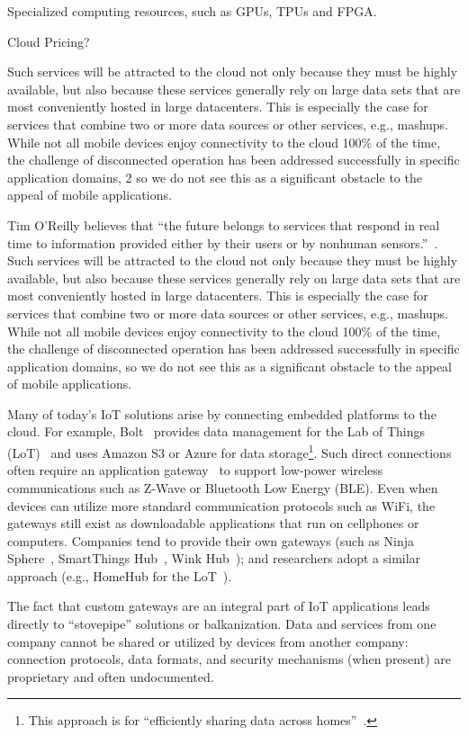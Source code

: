 Specialized computing resources, such as GPUs, TPUs and FPGA.

Cloud Pricing?

Such services will be attracted to the cloud not only because they must be
highly available, but also because these services generally rely on large data
sets that are most conveniently hosted in large datacenters. This is especially
the case for services that combine two or more data sources or other services,
e.g., mashups. While not all mobile devices enjoy connectivity to the cloud
100\% of the time, the challenge of disconnected operation has been addressed
successfully in specific application domains, 2 so we do not see this as a
significant obstacle to the appeal of mobile applications.

Tim O’Reilly believes that ``the future belongs to services that respond in real
time to information provided either by their users or by nonhuman
sensors.''~\cite{siegele2008let}. Such services will be attracted to the cloud
not only because they must be highly available, but also because these services
generally rely on large data sets that are most conveniently hosted in large
datacenters. This is especially the case for services that combine two or more
data sources or other services, e.g., mashups. While not all mobile devices
enjoy connectivity to the cloud 100\% of the time, the challenge of disconnected
operation has been addressed successfully in specific application domains, so we
do not see this as a significant obstacle to the appeal of mobile applications.

Many of today's IoT solutions arise by connecting embedded platforms to the
cloud.  For example, Bolt~\cite{gupta2014bolt} provides data management for the
Lab of Things (LoT)~\cite{brush2013lab} and uses Amazon S3 or Azure for data
storage\footnote{This approach is for ``efficiently sharing data across
  homes''~\cite{gupta2014bolt}.}.  Such direct connections often require an
application gateway~\cite{zachariah1001internet} to support low-power wireless
communications such as Z-Wave or Bluetooth Low Energy (BLE).  Even when devices
can utilize more standard communication protocols such as WiFi, the gateways
still exist as downloadable applications that run on cellphones or computers.
Companies tend to provide their own gateways (such as Ninja Sphere~\cite{ninja},
SmartThings Hub~\cite{smartthings}, Wink Hub~\cite{wink}); and researchers adopt
a similar approach (e.g., HomeHub for the LoT~\cite{brush2013lab}).

The fact that custom gateways are an integral part of IoT applications leads
directly to ``stovepipe'' solutions or balkanization. Data and services from one
company cannot be shared or utilized by devices from another company: connection
protocols, data formats, and security mechanisms (when present) are proprietary
and often undocumented.

